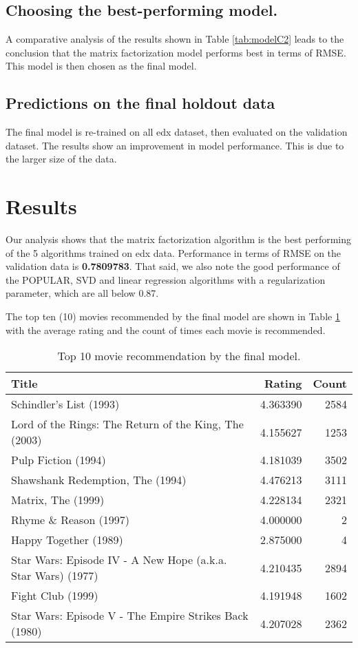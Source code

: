 \documentclass[
]{article}
\begin{document}
\subsection{Choosing the best-performing model.}\label{choosing-the-best-performing-model.}

A comparative analysis of the results shown in Table \ref{tab:modelC2} leads to the conclusion that the matrix factorization model performs best in terms of RMSE. This model is then chosen as the final model.

\subsection{Predictions on the final holdout data}\label{predictions-on-the-final-holdout-data}

The final model is re-trained on all edx dataset, then evaluated on the validation dataset. The results show an improvement in model performance. This is due to the larger size of the data.

\section{Results}\label{results}

Our analysis shows that the matrix factorization algorithm is the best performing of the 5 algorithms trained on edx data. Performance in terms of RMSE on the validation data is \textbf{0.7809783}. That said, we also note the good performance of the POPULAR, SVD and linear regression algorithms with a regularization parameter, which are all below 0.87.

The top ten (10) movies recommended by the final model are shown in Table \ref{tab:fmodpred} with the average rating and the count of times each movie is recommended.

\begin{table}[H]
\centering
\caption{\label{tab:fmodpred}Top 10 movie recommendation by the final model.}
\centering
\begin{tabular}[t]{lrr}
\toprule
Title & Rating & Count\\
\midrule
Schindler's List (1993) & 4.363390 & 2584\\
Lord of the Rings: The Return of the King, The (2003) & 4.155627 & 1253\\
Pulp Fiction (1994) & 4.181039 & 3502\\
Shawshank Redemption, The (1994) & 4.476213 & 3111\\
Matrix, The (1999) & 4.228134 & 2321\\
\addlinespace
Rhyme \& Reason (1997) & 4.000000 & 2\\
Happy Together (1989) & 2.875000 & 4\\
Star Wars: Episode IV - A New Hope (a.k.a. Star Wars) (1977) & 4.210435 & 2894\\
Fight Club (1999) & 4.191948 & 1602\\
Star Wars: Episode V - The Empire Strikes Back (1980) & 4.207028 & 2362\\
\bottomrule
\end{tabular}
\end{table}
\end{document}
